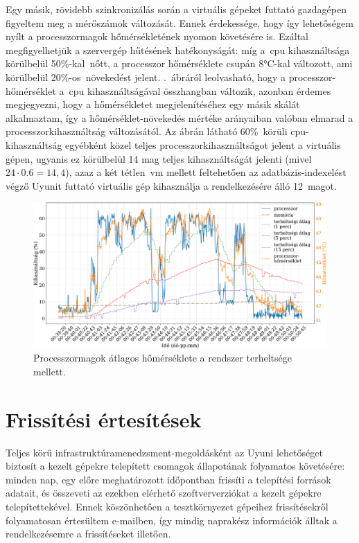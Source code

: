 Egy másik, rövidebb szinkronizálás során a virtuális gépeket futtató gazdagépen figyeltem meg a mérőszámok változását. Ennek érdekessége, hogy így lehetőségem nyílt a processzormagok hőmérsékletének nyomon követésére is. Ezáltal megfigyelhetjük a szervergép hűtésének hatékonyságát: míg a~\acrshort{cpu} kihasználtsága körülbelül 50\%-kal~nőtt, a processzor hőmérséklete csupán 8°C-kal változott, ami körülbelül 20\%-os~növekedést jelent. .~ábráról leolvasható, hogy a processzor-hőmérséklet a~\acrshort{cpu} kihasználtságával összhangban változik, azonban érdemes megjegyezni, hogy a hőmérsékletet megjelenítéséhez egy másik skálát alkalmaztam, így a hőmérséklet-növekedés mértéke arányaiban valóban elmarad a processzorkihasználtság változásától. Az ábrán látható 60\%~körüli \acrshort{cpu}-kihasználtság egyébként közel teljes processzorkihasználtságot jelent a virtuális gépen, ugyanis ez körülbelül 14 mag teljes kihasználtságát jelenti (mivel $ 24 \cdot 0.6  = 14,4 $), azaz a két tétlen~\acrshort{vm} mellett feltehetően az adatbázis-indexelést végző Uyunit futtató virtuális gép kihasználja a rendelkezésére álló 12~magot.

\begin{figure}[ht]
	\centering
	\includegraphics[width=15cm]{figures/reposync-vhost-cputemp.pdf}
	\caption{Processzormagok átlagos hőmérséklete a rendszer terheltsége mellett.}
	\label{fig:reposync-vhost-cputemp}
\end{figure}

\section{Frissítési értesítések}
Teljes körű infrastruktúramenedzsment-megoldásként az Uyuni lehetőséget biztosít a kezelt gépekre telepített csomagok állapotának folyamatos követésére: minden nap, egy előre meghatározott időpontban frissíti a telepítési források adatait, és összeveti az ezekben elérhető szoftververziókat a kezelt gépekre telepítettekével. Ennek köszönhetően a tesztkörnyezet gépeihez  frissítésekről folyamatosan értesültem e-mailben, így mindig naprakész információk álltak a rendelkezésemre a frissítéseket illetően.

